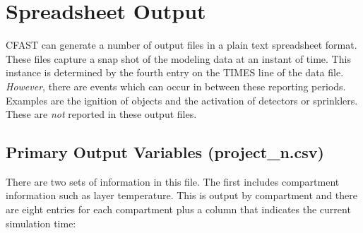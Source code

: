 \section{Spreadsheet Output}

CFAST can generate a number of output files in a plain text spreadsheet format.  These files capture a snap shot of the modeling data at an instant of time. This instance is determined by the fourth entry on the TIMES line of the data file. \emph{However}, there are events which can occur in between these reporting periods. Examples are the ignition of objects and the activation of detectors or sprinklers. These are \emph{not} reported in these output files.

\subsection{Primary Output Variables (project\_n.csv)}

There are two sets of information in this file. The first includes compartment information such as layer temperature. This is output by compartment and there are eight entries for each compartment plus a column that indicates the current simulation time:

